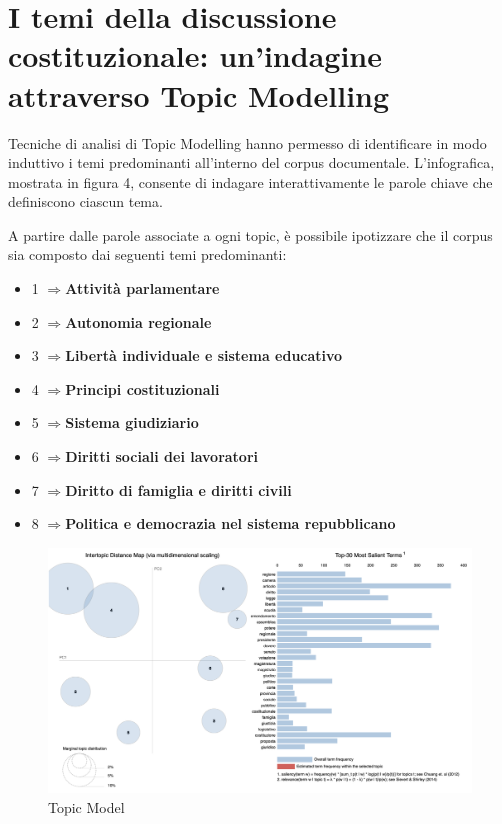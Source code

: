 \documentclass{article}
\begin{document}
\newpage
\section{I temi della discussione costituzionale: un'indagine attraverso Topic Modelling}


Tecniche di analisi di Topic Modelling hanno permesso di identificare in modo induttivo i temi predominanti all'interno del corpus documentale. L'infografica, mostrata in figura 4, consente di indagare interattivamente le parole chiave che definiscono ciascun tema.

A partire dalle parole associate a ogni topic, è possibile ipotizzare che il corpus sia composto dai seguenti temi predominanti:

\begin{itemize}
    \item 1 \(\Rightarrow\)\textbf{Attività parlamentare}
    \item 2 \(\Rightarrow\)\textbf{Autonomia regionale}
    \item 3 \(\Rightarrow\)\textbf{Libertà individuale e sistema educativo }
    \item 4 \(\Rightarrow\)\textbf{Principi costituzionali }
    \item 5 \(\Rightarrow\)\textbf{Sistema giudiziario}
    \item 6 \(\Rightarrow\)\textbf{Diritti sociali dei lavoratori}
    \item 7 \(\Rightarrow\)\textbf{Diritto di famiglia e diritti civili}
    \item 8 \(\Rightarrow\)\textbf{Politica e democrazia nel sistema repubblicano}
\end{itemize}

\begin{figure}[H]
    \centering
    \includegraphics[width=1\linewidth]{topic_model.png}
    \caption{Topic Model}
    \label{fig:enter-label}
\end{figure}
\end{document}

